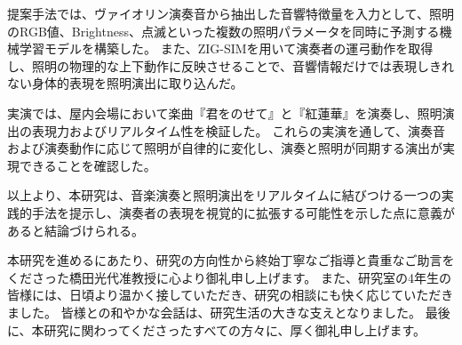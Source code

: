 提案手法では、ヴァイオリン演奏音から抽出した音響特徴量を入力として、照明のRGB値、Brightness、点滅といった複数の照明パラメータを同時に予測する機械学習モデルを構築した。
また、ZIG-SIMを用いて演奏者の運弓動作を取得し、照明の物理的な上下動作に反映させることで、音響情報だけでは表現しきれない身体的表現を照明演出に取り込んだ。

実演では、屋内会場において楽曲『君をのせて』と『紅蓮華』を演奏し、照明演出の表現力およびリアルタイム性を検証した。
これらの実演を通して、演奏音および演奏動作に応じて照明が自律的に変化し、演奏と照明が同期する演出が実現できることを確認した。

以上より、本研究は、音楽演奏と照明演出をリアルタイムに結びつける一つの実践的手法を提示し、演奏者の表現を視覚的に拡張する可能性を示した点に意義があると結論づけられる。


\begin{acknowledgment}
	本研究を進めるにあたり、研究の方向性から終始丁寧なご指導と貴重なご助言をくださった橋田光代准教授に心より御礼申し上げます。
	また、研究室の4年生の皆様には、日頃より温かく接していただき、研究の相談にも快く応じていただきました。
	皆様との和やかな会話は、研究生活の大きな支えとなりました。
	最後に、本研究に関わってくださったすべての方々に、厚く御礼申し上げます。
\end{acknowledgment}
